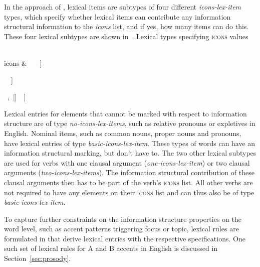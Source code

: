 \documentclass[output=paper]{langsci/langscibook}
\begin{document}
In the approach of \cite{song2018}, lexical items are subtypes of four
different \textit{icons-lex-item} types, which specify whether
lexical items can contribute any information structural information to
the \textit{icons} list, and if yes, how many items can do this. These four lexical
subtypes are shown in~.
\ea
\label{ex:song-icons-lex}
Lexical types specifying \textsc{icons} values \citep[137]{song2018}
\ea
\begin{avm}
  [\tp{no-icons-lex-item}\\
  mkg & [fc & na\\tp & na]\\
  icons & \<\ \normalfont{!}\ \normalfont{!}\ \>]
\end{avm}
\ex
\begin{avm}
\end{avm}
\ex
\begin{avm}
  [\tp{one-icons-lex-item}\\
  icons & \<\ \normalfont{!}\ []\ \normalfont{!}\ \>]
\end{avm}
\ex
\begin{avm}
  [\tp{two-icons-lex-item}\\
  icons & \<\ \normalfont{!}\ []\ ,\ []\ \normalfont{!}\ \>]
\end{avm}
\z
\z

Lexical entries for elements that cannot be marked with respect to
information structure are of type \textit{no-icons-lex-items}, such as
relative pronouns or expletives in English.  Nominal items, such as
common nouns, proper nouns and pronouns, have lexical entries of type
\textit{basic-icons-lex-item}. These types of words can have an
information structural marking, but don't have to. The two other
lexical subtypes are used for verbs with one clausal argument
(\textit{one-icons-lex-item}) or two clausal arguments
(\textit{two-icons-lex-items}). The information structural
contribution of these clausal arguments then has to be part of the
verb's \textsc{icons} list. All other verbs are not required to have any
elements on their \textsc{icons} list and can thus also be of type
\textit{basic-icons-lex-item}.

To capture further constraints on the information structure properties
on the word level, such as accent patterns triggering focus or topic,
lexical rules are formulated in \cite{song2018} that derive lexical entries with the
respective specifications. One such set of lexical rules for A and B
accents in English is discussed in Section~\ref{sec:prosody}.
\end{document}
